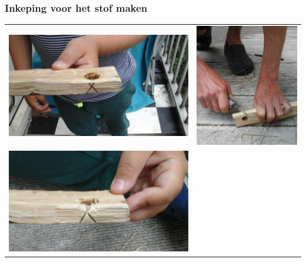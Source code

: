 \documentclass[a4paper, handout]{beamer}
\begin{document}
\begin{frame}
	\frametitle{Inkeping voor het stof maken}
	\begin{tabular}{ c c }
		\includegraphics[scale=0.15]{inkeping-1}
		&
		\includegraphics[scale=0.20]{inkeping-2}
		\\
		\includegraphics[scale=0.15]{inkeping-3}

\end{tabular}
\end{frame}
\end{document}
